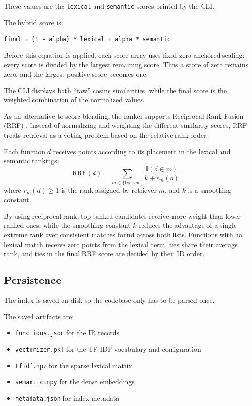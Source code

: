 \documentclass[12pt]{article}
\begin{document}
\noindent
These values are the \texttt{lexical} and \texttt{semantic} scores printed by the CLI.

The hybrid score is:

\begin{center}
  \texttt{final = (1 - alpha) * lexical + alpha * semantic}
\end{center}

Before this equation is applied, each score array uses fixed zero-anchored scaling: every score is divided by the largest remaining score.
Thus a score of zero remains zero, and the largest positive score becomes one.

The CLI displays both ``raw'' cosine similarities, while the final score is the weighted combination of the normalized values.

As an alternative to score blending, the ranker supports Reciprocal Rank Fusion (RRF) \cite{shah2024rrf}.
Instead of normalizing and weighting the different similarity scores, RRF treats retrieval as a voting problem based on the relative rank order.

Each function \(d\) receives points according to its placement in the lexical and semantic rankings:
\[
  \mathrm{RRF}(d) = \sum_{m \in \{\mathrm{lex}, \mathrm{sem}\}} \frac{\mathbb{I}(d \in m)}{k + r_m(d)}
\]
where \(r_m(d) \ge 1\) is the rank assigned by retriever \(m\), and \(k\) is a smoothing constant.

By using reciprocal rank, top-ranked candidates receive more weight than lower-ranked ones, while the smoothing constant \(k\) reduces
the advantage of a single extreme rank over consistent matches found across both lists.
Functions with no lexical match receive zero points from the lexical term, ties share their average rank, and ties in the final RRF score are decided by their ID order.

\subsection{Persistence}
\label{subsec:persistence}

The index is saved on disk so the codebase only has to be parsed once.

\noindent
The saved artifacts are:

\begin{itemize}
  \item \texttt{functions.json} for the IR records
  \item \texttt{vectorizer.pkl} for the TF-IDF vocabulary and configuration
  \item \texttt{tfidf.npz} for the sparse lexical matrix
  \item \texttt{semantic.npy} for the dense embeddings
  \item \texttt{metadata.json} for index metadata
\end{itemize}
\end{document}
